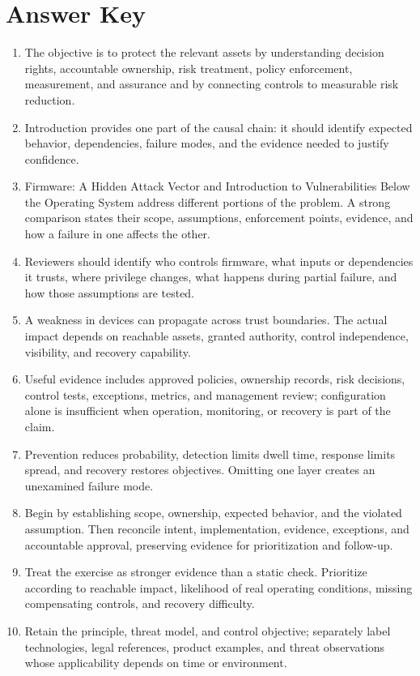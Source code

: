 \documentclass[11pt]{article}
\begin{document}
\section*{Answer Key}
\begin{enumerate}
\item The objective is to protect the relevant assets by understanding decision rights, accountable ownership, risk treatment, policy enforcement, measurement, and assurance and by connecting controls to measurable risk reduction.
\item Introduction provides one part of the causal chain: it should identify expected behavior, dependencies, failure modes, and the evidence needed to justify confidence.
\item Firmware: A Hidden Attack Vector and Introduction to Vulnerabilities Below the Operating System address different portions of the problem. A strong comparison states their scope, assumptions, enforcement points, evidence, and how a failure in one affects the other.
\item Reviewers should identify who controls firmware, what inputs or dependencies it trusts, where privilege changes, what happens during partial failure, and how those assumptions are tested.
\item A weakness in devices can propagate across trust boundaries. The actual impact depends on reachable assets, granted authority, control independence, visibility, and recovery capability.
\item Useful evidence includes approved policies, ownership records, risk decisions, control tests, exceptions, metrics, and management review; configuration alone is insufficient when operation, monitoring, or recovery is part of the claim.
\item Prevention reduces probability, detection limits dwell time, response limits spread, and recovery restores objectives. Omitting one layer creates an unexamined failure mode.
\item Begin by establishing scope, ownership, expected behavior, and the violated assumption. Then reconcile intent, implementation, evidence, exceptions, and accountable approval, preserving evidence for prioritization and follow-up.
\item Treat the exercise as stronger evidence than a static check. Prioritize according to reachable impact, likelihood of real operating conditions, missing compensating controls, and recovery difficulty.
\item Retain the principle, threat model, and control objective; separately label technologies, legal references, product examples, and threat observations whose applicability depends on time or environment.
\end{enumerate}
\end{document}
